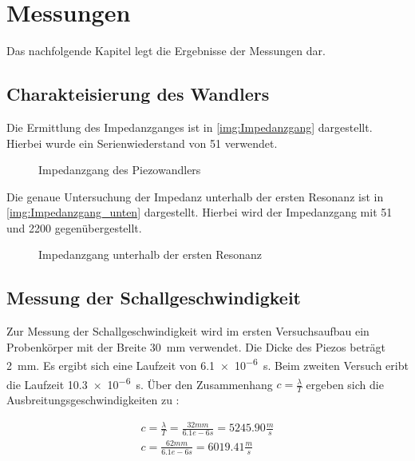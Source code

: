 \chapter{Messungen} \label{Messungen}

Das nachfolgende Kapitel legt die Ergebnisse der Messungen dar. 



\section{Charakteisierung des Wandlers}

Die Ermittlung des Impedanzganges ist in \autoref{img:Impedanzgang} dargestellt. Hierbei wurde ein Serienwiederstand von \SI{51}{\Omega} verwendet.


\begin{figure}[h]
    \centering
    
    \caption{Impedanzgang des Piezowandlers}
    \label{img:Impedanzgang}
\end{figure}


Die genaue Untersuchung der Impedanz unterhalb der ersten Resonanz ist in \autoref{img:Impedanzgang_unten} dargestellt. Hierbei wird der Impedanzgang mit \SI{51}{\Omega} und \SI{2200}{\Omega} gegenübergestellt.

\begin{figure}[h]
    \centering
    
    \caption{Impedanzgang unterhalb der ersten Resonanz}
    \label{img:Impedanzgang_unten}
\end{figure}




\section{Messung der Schallgeschwindigkeit} \label{Aufbau_Schall}
Zur Messung der Schallgeschwindigkeit wird im ersten Versuchsaufbau ein Probenkörper mit der Breite \SI{30}{mm} verwendet. Die Dicke des Piezos beträgt  \SI{2}{mm}. Es ergibt sich eine Laufzeit von \SI{6.1e-6}{s}. Beim zweiten Versuch eribt die Laufzeit \SI{10.3e-6}{s}.
Über den Zusammenhang  \(c=\frac{\lambda}{T}\) ergeben sich die Ausbreitungsgeschwindigkeiten zu :

\begin{equation*}
    \begin{split}
    c = \frac{\lambda}{T} = \frac{32 mm}{6.1e-6 s} = 5245.90 \frac{m}{s}  \\[.4cm]
    c = \frac{62 mm}{6.1e-6 s} = 6019.41 \frac{m}{s}  
    \end{split}
\end{equation*}




